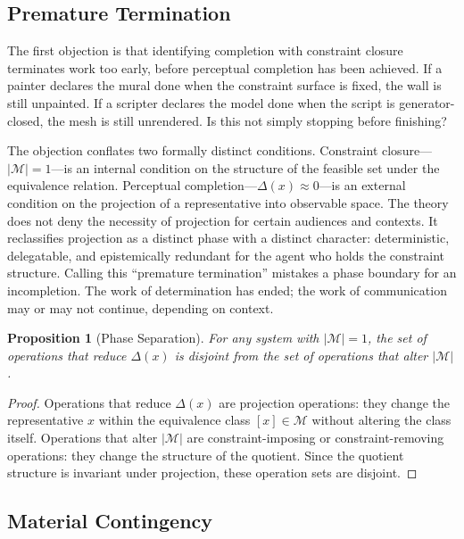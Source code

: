 \documentclass[11pt, twoside]{article}
\theoremstyle{plain}
\newtheorem{proposition}[theorem]{Proposition}
\theoremstyle{definition}
\theoremstyle{remark}
\begin{document}
\subsection{Premature Termination}

The first objection is that identifying completion with constraint closure terminates work too early, before perceptual completion has been achieved. If a painter declares the mural done when the constraint surface is fixed, the wall is still unpainted. If a scripter declares the model done when the script is generator-closed, the mesh is still unrendered. Is this not simply stopping before finishing?

The objection conflates two formally distinct conditions. Constraint closure---$|\mathcal{M}| = 1$---is an internal condition on the structure of the feasible set under the equivalence relation. Perceptual completion---$\Delta(x) \approx 0$---is an external condition on the projection of a representative into observable space. The theory does not deny the necessity of projection for certain audiences and contexts. It reclassifies projection as a distinct phase with a distinct character: deterministic, delegatable, and epistemically redundant for the agent who holds the constraint structure. Calling this ``premature termination'' mistakes a phase boundary for an incompletion. The work of determination has ended; the work of communication may or may not continue, depending on context.

\begin{proposition}[Phase Separation]
For any system with $|\mathcal{M}| = 1$, the set of operations that reduce $\Delta(x)$ is disjoint from the set of operations that alter $|\mathcal{M}|$.
\end{proposition}

\begin{proof}
Operations that reduce $\Delta(x)$ are projection operations: they change the representative $x$ within the equivalence class $[x] \in \mathcal{M}$ without altering the class itself. Operations that alter $|\mathcal{M}|$ are constraint-imposing or constraint-removing operations: they change the structure of the quotient. Since the quotient structure is invariant under projection, these operation sets are disjoint.
\end{proof}

\subsection{Material Contingency}
\end{document}
